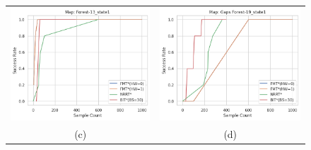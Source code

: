 \documentclass{article}
\begin{document}
\begin{figure}[H]
{\begin{tabular}{cc}
			\includegraphics[scale=0.45]{srVsc_Forest-13_state1.png} & \includegraphics[scale=0.45]{srVsc_Gaps Forest-19_state1.png}    \\
			(c) & (d) \\[6pt]

\end{tabular}}
\end{figure}
\end{document}
